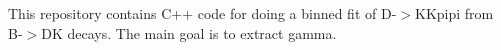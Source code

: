 This repository contains {\ttfamily C++} code for doing a binned fit of D-\/$>$KKpipi from B-\/$>$DK decays. The main goal is to extract gamma. 